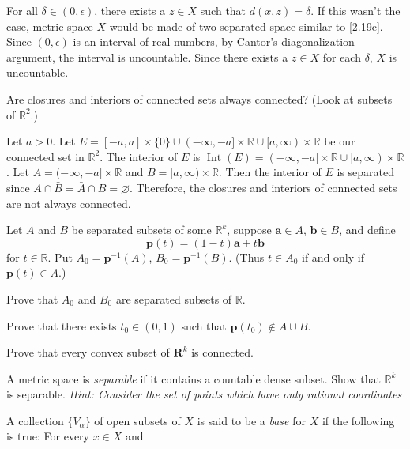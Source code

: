 \begin{exercise}
\begin{exercise}[label = (\alph*), ref = \arabic{exercisei} (\alph*)]
    For all \(\delta\in (0, \epsilon)\), there exists a \(z\in X\) such that
    \(d(x,z) = \delta\).
    If this wasn't the case, metric space \(X\) would be made of two separated
    space similar to \cref{2.19c}.
    Since \((0,\epsilon)\) is an interval of real numbers, by Cantor's
    diagonalization argument, the interval is uncountable.
    Since there exists a \(z\in X\) for each \(\delta\), \(X\) is uncountable.
  \end{exercise}
\item
  Are closures and interiors of connected sets always connected?
  (Look at subsets of \(\mathbb{R}^2\).)
  \par\smallskip
  Let \(a > 0\).
  Let \(E = [-a,a]\times\{0\}\cup (-\infty,-a]\times\mathbb{R}\cup
  [a,\infty)\times\mathbb{R}\) be our connected set in \(\mathbb{R}^2\).
  The interior of \(E\) is
  \(\operatorname{Int}(E) = (-\infty,-a]\times\mathbb{R}\cup
  [a,\infty)\times\mathbb{R}\).
  Let \(A = (-\infty,-a]\times\mathbb{R}\) and
  \(B = [a,\infty)\times\mathbb{R}\).
  Then the interior of \(E\) is separated since
  \(A\cap\bar{B} = \bar{A}\cap B = \varnothing\).
  Therefore, the closures and interiors of connected sets are not always
  connected.
\item
  Let \(A\) and \(B\) be separated subsets of some \(\mathbb{R}^k\), suppose
  \(\mathbold{a}\in A\), \(\mathbold{b}\in B\), and define
  \[
  \mathbold{p}(t) = (1 - t)\mathbold{a} + t\mathbold{b}
  \]
  for \(t\in\mathbb{R}\).
  Put \(A_0 = \mathbold{p}^{-1}(A)\), \(B_0 = \mathbold{p}^{-1}(B)\).
  (Thus \(t\in A_0\) if and only if \(\mathbold{p}(t)\in A\).)
  \begin{exercise}[label = (\alph*)]
  \item
    Prove that \(A_0\) and \(B_0\) are separated subsets of \(\mathbb{R}\).
  \item
    Prove that there exists \(t_0\in (0, 1)\) such that
    \(\mathbold{p}(t_0)\not\in A\cup B\).
  \item
    Prove that every convex subset of \(\mathbold{R}^k\) is connected.
  \end{exercise}
\item
  \label{2.22}
  A metric space is \textit{separable} if it contains a countable dense subset.
  Show that \(\mathbb{R}^k\) is separable.
  \textit{Hint: Consider the set of points which have only rational
    coordinates}
\item
  \label{2.23}
  A collection \(\{V_{\alpha}\}\) of open subsets of \(X\) is said to be a
  \textit{base} for \(X\) if the following is true: For every \(x\in X\) and

\end{exercise}
